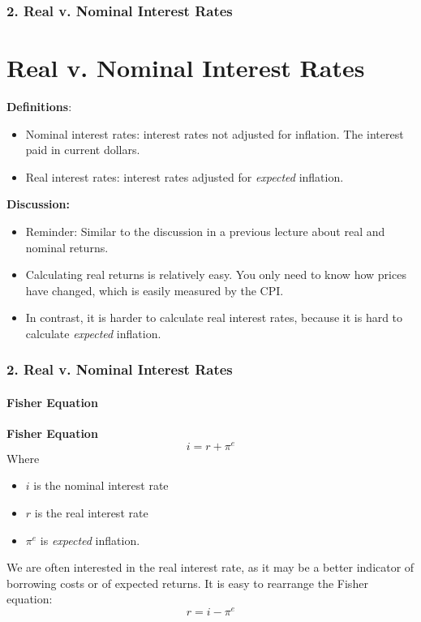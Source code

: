\documentclass{beamer}
\begin{document}
\begin{frame}[t]
    \frametitle{2. Real v. Nominal Interest Rates}
    \section{Real v. Nominal Interest Rates}

    \textbf{Definitions}:
    \begin{itemize}
        \item Nominal interest rates: interest rates not adjusted for inflation.  The interest paid in current dollars.
        \item Real interest rates: interest rates adjusted for \textit{expected} inflation.
    \end{itemize}

    \textbf{Discussion:}
    \begin{itemize}
        \item Reminder: Similar to the discussion in a previous lecture about real and nominal returns.
        \item Calculating real returns is relatively easy.  You only need to know how prices have changed, which is easily measured by the CPI.
        \item In contrast, it is harder to calculate real interest rates, because it is hard to calculate \textit{expected} inflation.
    \end{itemize}

\end{frame}

\begin{frame}[t]
    \frametitle{2. Real v. Nominal Interest Rates}
    \framesubtitle{Fisher Equation}

    \textbf{Fisher Equation}
    $$ i = r + \pi^e$$
    Where
    \begin{itemize}
        \item $i$ is the nominal interest rate
        \item $r$ is the real interest rate
        \item $\pi^e$ is \textit{expected} inflation.
    \end{itemize}
    \vspace{1em}
    
    We are often interested in the real interest rate, as it may be a better indicator of borrowing costs or of expected returns.   It is easy to rearrange the Fisher equation:
    $$ r = i - \pi^e$$

\end{frame}
\end{document}
